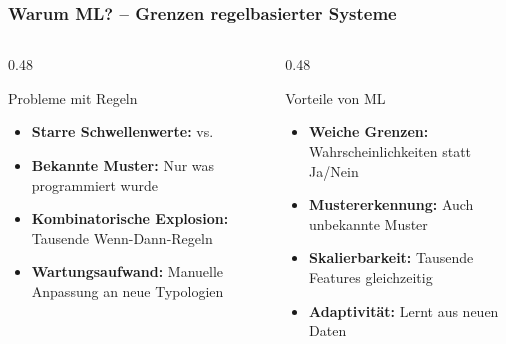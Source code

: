 \documentclass[11pt, aspectratio=169]{beamer}
\begin{document}
\begin{frame}
    \frametitle{Warum ML? -- Grenzen regelbasierter Systeme}
    \begin{columns}[t]
        \begin{column}{0.48\textwidth}
            \begin{alertblock}{Probleme mit Regeln}
                \begin{itemize}
                    \item \textbf{Starre Schwellenwerte:}  vs. 
                    \item \textbf{Bekannte Muster:} Nur was programmiert wurde
                    \item \textbf{Kombinatorische Explosion:} Tausende Wenn-Dann-Regeln
                    \item \textbf{Wartungsaufwand:} Manuelle Anpassung an neue Typologien
                \end{itemize}
            \end{alertblock}
        \end{column}
        \begin{column}{0.48\textwidth}
            \begin{block}{Vorteile von ML}
                \begin{itemize}
                    \item \textbf{Weiche Grenzen:} Wahrscheinlichkeiten statt Ja/Nein
                    \item \textbf{Mustererkennung:} Auch unbekannte Muster
                    \item \textbf{Skalierbarkeit:} Tausende Features gleichzeitig
                    \item \textbf{Adaptivität:} Lernt aus neuen Daten
                \end{itemize}
            \end{block}
        \end{column}
    \end{columns}
\end{frame}
\end{document}
